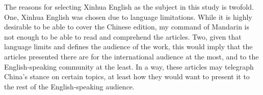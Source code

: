 The reasons for selecting Xinhua English as the subject in this study
is twofold. One, Xinhua English was chosen due to language limitations.
While it is highly desirable to be able to cover the Chinese edition,
my command of Mandarin is not enough to be able to read and comprehend
the articles. Two, given that language limits and defines the audience
of the work, this would imply that the articles presented there are for
the international audience at the most, and to the English-speaking
community at the least. In a way, these articles may telegraph China's
stance on certain topics, at least how they would want to present it to
the rest of the English-speaking audience.

